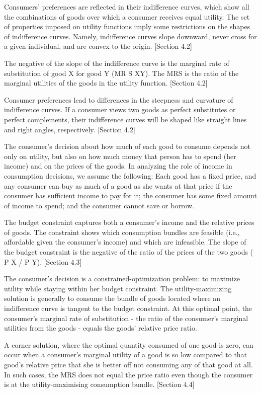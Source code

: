 Consumers' preferences are reflected in their indifference curves, which show all the combinations of goods over which a consumer receives equal utility. The set of properties imposed on utility functions imply some restrictions on the shapes of indifference curves. Namely, indifference curves slope downward, never cross for a given individual, and are convex to the origin. [Section 4.2]

The negative of the slope of the indifference curve is the marginal rate of substitution of good X for good Y (MR S XY). The MRS is the ratio of the marginal utilities of the goods in the utility function. [Section 4.2]

Consumer preferences lead to differences in the steepness and curvature of indifference curves. If a consumer views two goods as perfect substitutes or perfect complements, their indifference curves will be shaped like straight lines and right angles, respectively. [Section 4.2]

The consumer's decision about how much of each good to consume depends not only on utility, but also on how much money that person has to spend (her income) and on the prices of the goods. In analyzing the role of income in consumption decisions, we assume the following: Each good has a fixed price, and any consumer can buy as much of a good as she wants at that price if the consumer has sufficient income to pay for it; the consumer has some fixed amount of income to spend; and the consumer cannot save or borrow.

The budget constraint captures both a consumer's income and the relative prices of goods. The constraint shows which consumption bundles are feasible (i.e., affordable given the consumer's income) and which are infeasible. The slope of the budget constraint is the negative of the ratio of the prices of the two goods ( P X / P Y). [Section 4.3]

The consumer's decision is a constrained-optimization problem: to maximize utility while staying within her budget constraint. The utility-maximizing solution is generally to consume the bundle of goods located where an indifference curve is tangent to the budget constraint. At this optimal point, the consumer's marginal rate of substitution - the ratio of the consumer's marginal utilities from the goods - equals the goods' relative price ratio.

A corner solution, where the optimal quantity consumed of one good is zero, can occur when a consumer's marginal utility of a good is so low compared to that good's relative price that she is better off not consuming any of that good at all. In such cases, the MRS does not equal the price ratio even though the consumer is at the utility-maximising consumption bundle. [Section 4.4]

